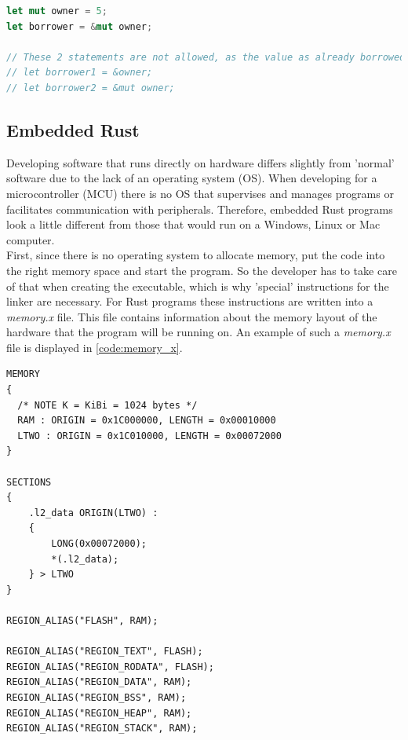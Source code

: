 \begin{lstlisting}[style=colorEX,language=Rust,caption={Simple example of a mutable borrow},label={code:mut_borrow}]
let mut owner = 5;
let borrower = &mut owner;

// These 2 statements are not allowed, as the value as already borrowed as mutable.
// let borrower1 = &owner;
// let borrower2 = &mut owner;
\end{lstlisting}

\subsection{Embedded Rust}

Developing software that runs directly on hardware differs slightly from 'normal' software due to the lack of an operating system (OS).
When developing for a microcontroller (MCU) there is no OS that supervises and manages programs or facilitates communication with peripherals.
Therefore, embedded Rust programs look a little different from those that would run on a Windows, Linux or Mac computer.
\\
First, since there is no operating system to allocate memory, put the code into the right memory space and start the program.
So the developer has to take care of that when creating the executable, which is why 'special' instructions for the linker are necessary.
For Rust programs these instructions are written into a \emph{memory.x} file.
This file contains information about the memory layout of the hardware that the program will be running on.
An example of such a \emph{memory.x} file is displayed in \ref{code:memory_x}.

\newpage
\begin{lstlisting}[style=colorEX,caption={Example memory.x file},label={code:memory_x}]
MEMORY
{
  /* NOTE K = KiBi = 1024 bytes */
  RAM : ORIGIN = 0x1C000000, LENGTH = 0x00010000
  LTWO : ORIGIN = 0x1C010000, LENGTH = 0x00072000
}

SECTIONS
{
    .l2_data ORIGIN(LTWO) :
    {
        LONG(0x00072000);
        *(.l2_data);
    } > LTWO
}

REGION_ALIAS("FLASH", RAM);

REGION_ALIAS("REGION_TEXT", FLASH);
REGION_ALIAS("REGION_RODATA", FLASH);
REGION_ALIAS("REGION_DATA", RAM);
REGION_ALIAS("REGION_BSS", RAM);
REGION_ALIAS("REGION_HEAP", RAM);
REGION_ALIAS("REGION_STACK", RAM);

\end{lstlisting}


